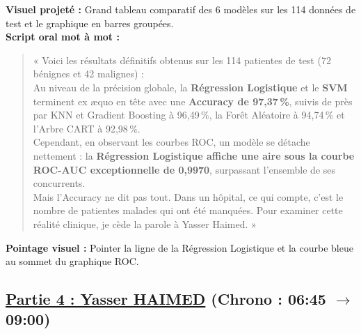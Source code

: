 \documentclass[a4paper,11pt]{article}
\begin{document}
\begin{tcolorbox}[speechbox, title={Slide 7 : Benchmark Global sur le Jeu de Test Vierge (05:35 -- 06:45)}]
	\textbf{Visuel projeté :} Grand tableau comparatif des 6 modèles sur les 114 données de test et le graphique en barres groupées.\\
	\textbf{Script oral mot à mot :}
	\begin{quote}
		« Voici les résultats définitifs obtenus sur les 114 patientes de test (72 bénignes et 42 malignes) :\\
		Au niveau de la précision globale, la \textbf{Régression Logistique} et le \textbf{SVM} terminent ex æquo en tête avec une \textbf{Accuracy de 97,37\,\%}, suivis de près par KNN et Gradient Boosting à 96,49\,\%, la Forêt Aléatoire à 94,74\,\% et l'Arbre CART à 92,98\,\%.\\
		Cependant, en observant les courbes ROC, un modèle se détache nettement : la \textbf{Régression Logistique affiche une aire sous la courbe ROC-AUC exceptionnelle de 0,9970}, surpassant l'ensemble de ses concurrents.\\
		Mais l'Accuracy ne dit pas tout. Dans un hôpital, ce qui compte, c'est le nombre de patientes malades qui ont été manquées. Pour examiner cette réalité clinique, je cède la parole à Yasser Haimed. »
	\end{quote}
	\textbf{Pointage visuel :} Pointer la ligne de la Régression Logistique et la courbe bleue au sommet du graphique ROC.
\end{tcolorbox}

\subsection*{\color{primarygreen}\underline{Partie 4 : Yasser HAIMED} (Chrono : 06:45 $\to$ 09:00)}
\end{document}
